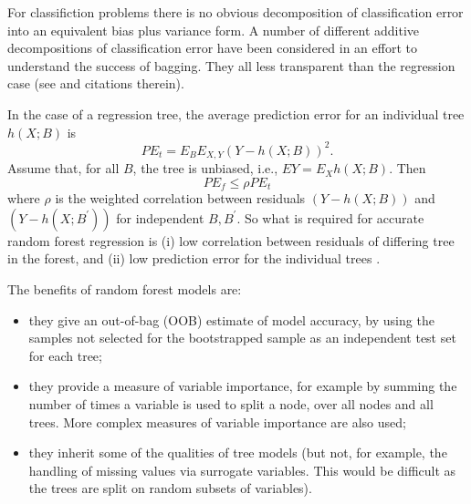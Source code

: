 \documentclass[10pt,letterpaper]{article}
\begin{document}
For classifiction problems there is no obvious decomposition of classification error into an equivalent bias plus
variance form. A number of different additive decompositions of classification error have been considered in an effort
to understand the success of bagging. They all less transparent than the regression case (see \cite{Friedman.1997} and
citations therein).

In the case of a regression tree, the average prediction error for an individual tree $h(X; B)$ is
\begin{equation}
PE_t = E_B E_{X,Y} (Y-h(X; B))^2.
\end{equation}
Assume that, for all $B$, the tree is unbiased, i.e., $EY= E_X h(X; B)$. Then
\begin{equation}
PE_f \leq \rho PE_t
\end{equation}
where $\rho$ is the weighted correlation between residuals $(Y-h(X;B))$ and $(Y-h(X;B^\prime))$ for independent
$B,B^\prime$.
So what is required for accurate random forest regression is (i) low correlation between residuals of differing tree in
the forest, and (ii) low prediction error for the individual trees \cite{Segal.2004}. 

The benefits of random forest models are:
\begin{itemize}
\item they give an out-of-bag (OOB) estimate of model accuracy, by using the samples not selected for the bootstrapped sample
  as an independent test set for each tree;
\item they provide a measure of variable importance, for example by summing the number of times a variable is used to
  split a node, over all nodes and all trees. More complex measures of variable importance are also used;
\item they inherit some of the qualities of tree models (but not, for example, the handling of missing values via surrogate
  variables. This would be difficult as the trees are split on random subsets of variables).
\end{itemize}
\end{document}
